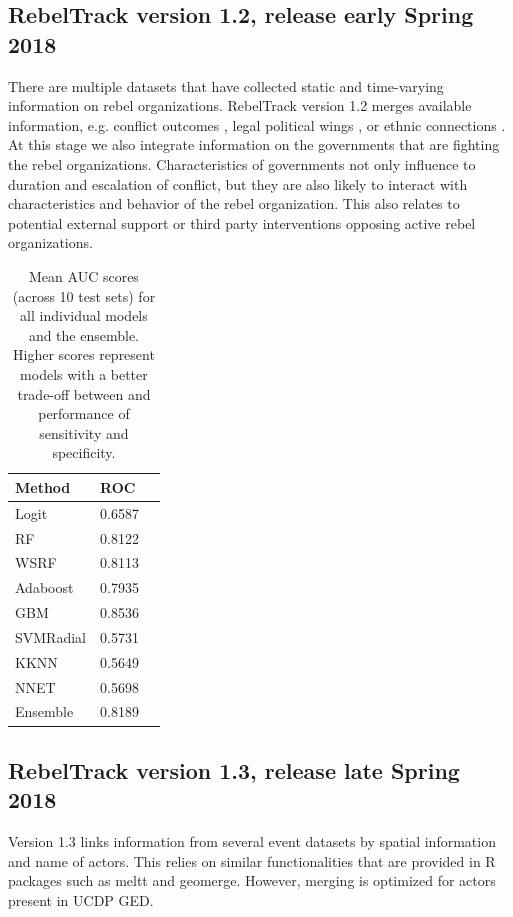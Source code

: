 \documentclass[11pt,oneside,fullpage]{amsart}
\begin{document}
\subsection{RebelTrack version 1.2, release early Spring 2018}
There are multiple datasets that have collected static and time-varying information on rebel organizations. RebelTrack version 1.2 merges available information, e.g. conflict outcomes \citep{kreutz10}, legal political wings \citep{cunningham09}, or ethnic connections \citep{jwnm:2012}. At this stage we also integrate information on the governments that are fighting the rebel organizations. Characteristics of governments not only influence to duration and escalation of conflict, but they are also likely to interact with characteristics and behavior of the rebel organization. This also relates to potential external support or third party interventions opposing active rebel organizations.


\begin{table}
\caption{Mean AUC scores (across 10 test sets) for all individual models and the ensemble. Higher scores represent models with a better trade-off between and performance of sensitivity and specificity.}
\begin{tabular}{lll}
Method & ROC \\ \hline
 Logit & 0.6587\\
 RF & 0.8122\\
 WSRF & 0.8113\\
 Adaboost & 0.7935\\
 GBM & 0.8536\\
 SVMRadial & 0.5731 \\
 KKNN & 0.5649\\
 NNET & 0.5698\\ \hline
 Ensemble & 0.8189\\
\end{tabular}
\label{tab:roc_models}
\end{table}

\subsection{RebelTrack version 1.3, release late Spring 2018}
Version 1.3 links information from several event datasets \citep{BoscheeElizabethLautenschlagerJenniferOBrien2015,phoenix} by spatial information and name of actors. This relies on similar functionalities that are provided in R packages such as meltt and geomerge. However, merging is optimized for actors present in UCDP GED.  
\end{document}
